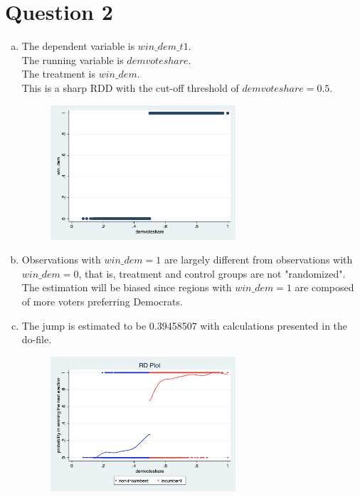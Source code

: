 \documentclass[12pt]{article}
\begin{document}
\section*{Question 2}
\begin{enumerate}[(a)]
    \item The dependent variable is $win\_dem\_t1$. \\ 
    The running variable is $demvoteshare$. \\ 
    The treatment is $win\_dem$. \\ 
    This is a sharp RDD with the cut-off threshold of $demvoteshare = 0.5$. \\ 
    \begin{figure}[H]
        \centering
        \includegraphics[width=0.65\textwidth]{RDD scatter.jpg}
    \end{figure}
    \item Observations with $win\_dem = 1$ are largely different from observations with $win\_dem = 0$, that is, treatment and control groups are not "randomized". 
    The estimation will be biased since regions with $win\_dem = 1$ are composed of more voters preferring Democrats.
    \item The jump is estimated to be 0.39458507 with calculations presented in the do-file.
    \begin{figure}[H]
        \centering
        \includegraphics[width=0.65\textwidth]{RD plot_new.jpg}

\end{figure}
\end{enumerate}
\end{document}
